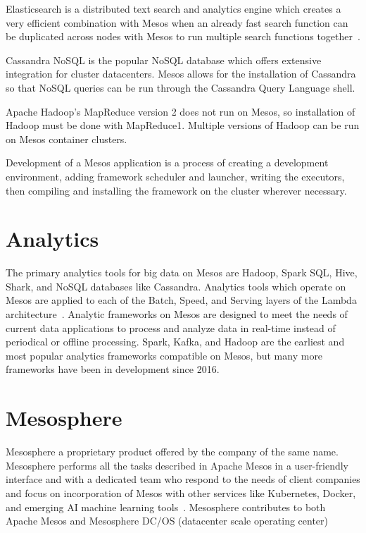 Elasticsearch is a distributed text search and analytics engine which creates a very efficient combination with Mesos when an already fast search function can be duplicated across nodes with Mesos to run multiple search functions together~\cite{hid-sp18-404-Vanderzyden2015}. 

Cassandra NoSQL is the popular NoSQL database which offers extensive integration for cluster datacenters.  Mesos allows for the installation of Cassandra so that NoSQL queries can be run through the Cassandra Query Language shell. 

Apache Hadoop's MapReduce version 2 does not run on Mesos, so installation of Hadoop must be done with MapReduce1. Multiple versions of Hadoop can be run on Mesos container clusters. 

Development of a Mesos application is a process of creating a development environment, adding framework scheduler and launcher, writing the executors, then compiling and installing the framework on the cluster wherever necessary.  

\section{Analytics}

The primary analytics tools for big data on Mesos are Hadoop, Spark SQL, Hive, Shark, and NoSQL databases like Cassandra. Analytics tools which operate on Mesos are applied to each of the Batch, Speed, and Serving layers of the Lambda architecture~\cite{hid-sp18-404-Kakadia2015}. Analytic frameworks on Mesos are designed to meet the needs of current data applications to process and analyze data in real-time instead of periodical or offline processing. Spark, Kafka, and Hadoop are the earliest and most popular analytics frameworks compatible on Mesos, but many more frameworks have been in development since 2016. 

\section{Mesosphere}

Mesosphere a proprietary product offered by the company of the same name. Mesosphere performs all the tasks described in Apache Mesos in a user-friendly interface and with a dedicated team who respond to the needs of client companies and focus on incorporation of Mesos with other services like Kubernetes, Docker, and emerging AI machine learning tools~\cite{hid-sp18-404-Mae2018}. Mesosphere contributes to both Apache Mesos and Mesosphere DC/OS (datacenter scale operating center)

